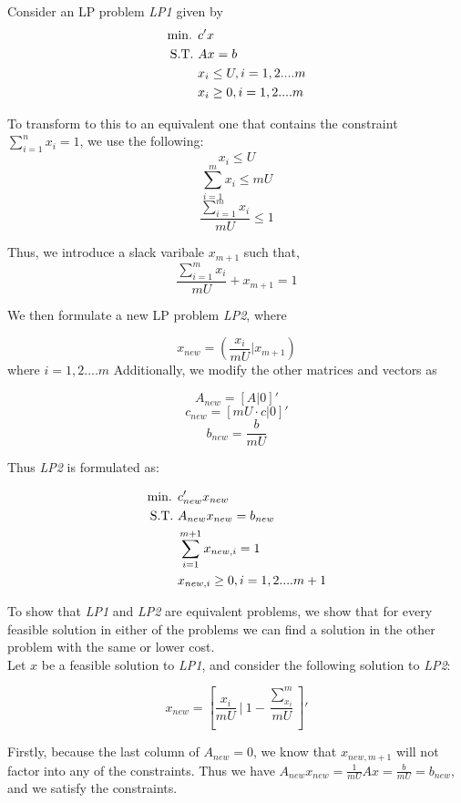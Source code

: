 Consider an LP problem \textit{LP1} given by
\begin{align}
    \text{min. } &c'x \notag\\
    \text{S.T. } &Ax = b \notag\\
    &x_i \le U, i = 1,2....m \notag\\
    &x_i \ge 0, i = 1,2....m \notag\\
\end{align}

To transform to this to an equivalent one that contains the constraint $\sum_{i=1}^{n}x_i = 1$, we use the following: 
\[ x_i \le U\]
\[ \sum_{i=1}^{m}x_i \le mU \]
\[ \frac{\sum_{i=1}^{m}x_i}{mU} \le 1\]

Thus, we introduce a slack varibale $x_{m+1}$ such that, 
\[ \frac{\sum_{i=1}^{m}x_i}{mU} + x_{m+1} = 1\]

We then formulate a new LP problem \textit{LP2}, where

\[ x_{new} = (\frac{x_i}{mU} | x_{m+1})\]
where $i=1,2....m$
Additionally, we modify the other matrices and vectors as 

\[ A_{new} = [A | 0]'\]
\[ c_{new} = [mU\cdot c | 0]'\]
\[ b_{new} = \frac{b}{mU}\]

Thus \textit{LP2} is formulated as:


\begin{align}
    \text{min. } &c_{new}'x_{new} \notag\\
    \text{S.T. } &A_{new}x_{new} = b_{new} \notag\\
    &\sum_{i=1}^{m+1}x_{new,i} = 1 \notag \\
    &x_{new,i} \ge 0, i = 1,2....m+1 \notag\\
\end{align}

To show that \textit{LP1} and \textit{LP2} are equivalent problems, we show that for every feasible solution in either of the problems we can find a solution in the other problem with the same or lower cost.\\

Let $x$ be a feasible solution to \textit{LP1}, and consider the following solution to \textit{LP2}:

\[x_{new} = \left[\frac{x_i}{mU} \:|\: 1 - \frac{\sum_{x_i}^{m}}{mU}\right]'\]

Firstly, because the last column of $A_{new}=0$, we know that $x_{new, m+1}$ will not factor into any of the constraints. Thus we have $A_{new}x_{new}=\frac{1}{mU}Ax=\frac{b}{mU}=b_{new}$, and we satisfy the constraints.

